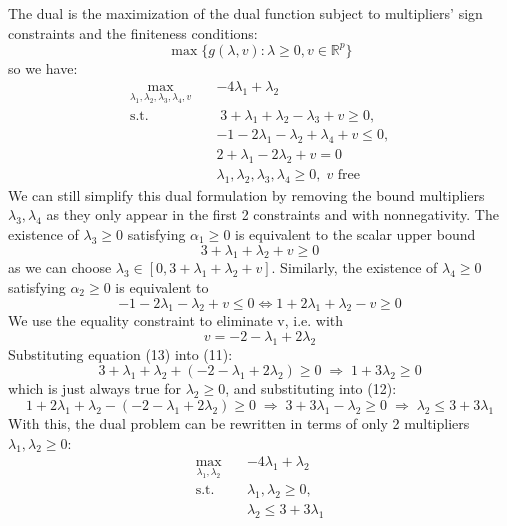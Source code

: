 \documentclass[12pt]{article}
\begin{document}
The dual is the maximization of the dual function subject to multipliers' sign constraints and the finiteness conditions: \begin{equation}
    \max \{g(\lambda, v): \lambda \geq 0, v \in \mathbb{R}^p\}
\end{equation} so we have: \begin{align*}
    \max_{\lambda_1, \lambda_2, \lambda_3, \lambda_4, v} \quad & -4\lambda_1 + \lambda_2 \\ 
    \text{s.t. } & \; 3 + \lambda_1 + \lambda_2 - \lambda_3 + v \geq 0, \\ 
    & -1 -2 \lambda_1 - \lambda_2 + \lambda_4 + v \leq 0, \\ 
    & 2 + \lambda_1 -2\lambda_2 + v = 0 \\ 
    & \lambda_1, \lambda_2, \lambda_3, \lambda_4 \geq 0, \; v \text{ free}
\end{align*} We can still simplify this dual formulation by removing the bound multipliers $\lambda_3, \lambda_4$ as they only appear in the first 2 constraints and with nonnegativity. The existence of $\lambda_3 \geq 0$ satisfying $\alpha_1 \geq 0$ is equivalent to the scalar upper bound \begin{equation}
    3 + \lambda_1 + \lambda_2 + v \geq 0 
\end{equation} as we can choose $\lambda_3 \in [0, 3 + \lambda_1 + \lambda_2 + v]$. Similarly, the existence of $\lambda_4 \geq 0$ satisfying $\alpha_2 \geq 0$ is equivalent to \begin{equation}
    -1 -2\lambda_1 - \lambda_2 + v \leq 0 \Longleftrightarrow 1 + 2\lambda_1 + \lambda_2 - v \geq 0
\end{equation} We use the equality constraint to eliminate v, i.e. with \begin{equation}
    v = -2 - \lambda_1 + 2\lambda_2
\end{equation} Substituting equation (13) into (11): \begin{equation*}
    3 + \lambda_1 + \lambda_2 + (-2 - \lambda_1 + 2\lambda_2) \geq 0 \; \Longrightarrow \; 1 + 3 \lambda_2 \geq 0
\end{equation*} which is just always true for $\lambda_2 \geq 0$, and substituting into (12): \begin{equation*}
    1 + 2\lambda_1 + \lambda_2 - (-2 - \lambda_1 + 2\lambda_2) \geq 0 \; \Longrightarrow \; 3 + 3\lambda_{1} - \lambda_2 \geq 0 \; \Longrightarrow \; \lambda_2 \leq 3 + 3\lambda_1 
\end{equation*} With this, the dual problem can be rewritten in terms of only 2 multipliers $\lambda_1, \lambda_2 \geq 0$: \begin{align*}
    \max_{\lambda_1, \lambda_2} \quad & -4\lambda_1 + \lambda_2 \\ 
    \text{s.t. } \; & \lambda_1, \lambda_2 \geq 0, \\ 
    & \lambda_2 \leq 3 + 3\lambda_1 
\end{align*}
\end{document}

